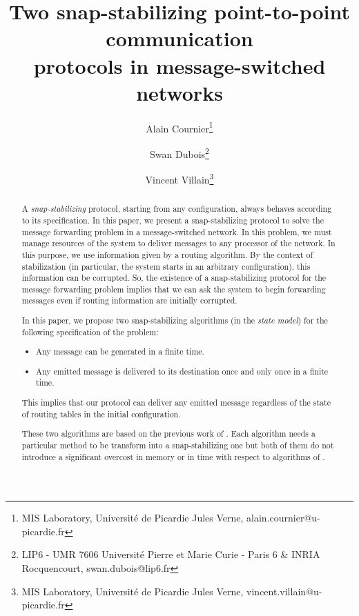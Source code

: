 \documentclass[11pt]{article}
\date{}
\begin{document}
\newcommand{\AN}{~}
\newcommand{\AD}{~}



\title{Two snap-stabilizing point-to-point communication\\ protocols in message-switched networks}

\author{
Alain Cournier\thanks{MIS Laboratory, Universit\'e de Picardie Jules Verne, alain.cournier@u-picardie.fr}
\and 
Swan Dubois\thanks{LIP6 - UMR 7606 Universit\'e Pierre et Marie Curie - Paris 6 \& INRIA Rocquencourt, swan.dubois@lip6.fr}
\and
Vincent Villain\thanks{MIS Laboratory, Universit\'e de Picardie Jules Verne, vincent.villain@u-picardie.fr}
}

\maketitle



\begin{abstract}
A \emph{snap-stabilizing} protocol, starting from any configuration, always behaves according to its specification. In this paper, we present a snap-stabilizing protocol to solve the message forwarding problem in a message-switched network. In this problem, we must manage resources of the system to deliver messages to any processor of the network. In this purpose, we use information given by a routing algorithm. By the context of stabilization (in particular, the system starts in an arbitrary configuration), this information can be corrupted. So, the existence of a snap-stabilizing protocol for the message forwarding problem implies that we can ask the system to begin forwarding messages even if routing information are initially corrupted.

In this paper, we propose two snap-stabilizing algorithms (in the \emph{state model}) for the following specification of the problem:
\begin{itemize}
	\item Any message can be generated in a finite time.
	\item Any emitted message is delivered to its destination once and only once in a finite time.
\end{itemize}
This implies that our protocol can deliver any emitted message regardless of the state of routing tables in the initial configuration.

These two algorithms are based on the previous work of \cite{MS78}. Each algorithm needs a particular method to be transform into a snap-stabilizing one but both of them do not introduce a significant overcost in memory or in time with respect to algorithms of \cite{MS78}.
\end{abstract}
\end{document}
